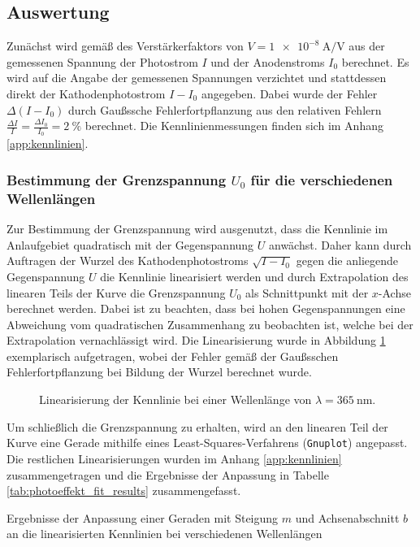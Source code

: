 \documentclass[11pt, a4paper]{article}
\numberwithin{equation}{section}
\begin{document}
\subsection{Auswertung}
Zunächst wird gemäß des Verstärkerfaktors von $V = \SI{1e-8}{\ampere\per\volt}$ aus der gemessenen Spannung der Photostrom $I$ und der Anodenstroms $I_0$ berechnet.
Es wird auf die Angabe der gemessenen Spannungen verzichtet und stattdessen direkt der Kathodenphotostrom $I-I_0$ angegeben.
Dabei wurde der Fehler $\Delta (I - I_0)$ durch Gaußssche Fehlerfortpflanzung aus den relativen Fehlern $\frac{\Delta I}{I} = \frac{\Delta I_0}{I_0} = \SI{2}{\percent}$ berechnet.
Die Kennlinienmessungen finden sich im Anhang \ref{app:kennlinien}.



\subsubsection{Bestimmung der Grenzspannung $U_0$ für die verschiedenen Wellenlängen}
\label{sssec:photoeffekt_grenzspannung}
Zur Bestimmung der Grenzspannung wird ausgenutzt, dass die Kennlinie im Anlaufgebiet quadratisch mit der Gegenspannung $U$ anwächst.
Daher kann durch Auftragen der Wurzel des Kathodenphotostroms $\sqrt{I-I_0}$ gegen die anliegende Gegenspannung $U$ die Kennlinie linearisiert werden und durch Extrapolation des linearen Teils der Kurve die Grenzspannung $U_0$ als Schnittpunkt mit der $x$-Achse berechnet werden.
Dabei ist zu beachten, dass bei hohen Gegenspannungen eine Abweichung vom quadratischen Zusammenhang zu beobachten ist, welche bei der Extrapolation vernachlässigt wird.
Die Linearisierung wurde in Abbildung \ref{fig:kennlinien_exemp_365nm} exemplarisch aufgetragen, wobei der Fehler gemäß der Gaußsschen Fehlerfortpflanzung bei Bildung der Wurzel berechnet wurde.
\begin{figure}[h]
	\centering
	
	\caption{Linearisierung der Kennlinie bei einer Wellenlänge von $\lambda = \SI{365}{\nano\metre}$. }
	\label{fig:kennlinien_exemp_365nm}
\end{figure}
Um schließlich die Grenzspannung zu erhalten, wird an den linearen Teil der Kurve eine Gerade mithilfe eines Least-Squares-Verfahrens (\texttt{Gnuplot}) angepasst.
Die restlichen Linearisierungen wurden im Anhang \ref{app:kennlinien} zusammengetragen und die Ergebnisse der Anpassung in Tabelle \ref{tab:photoeffekt_fit_results} zusammengefasst.
\begin{table}[h]
	\centering
	
	\caption{Ergebnisse der Anpassung einer Geraden mit Steigung $m$ und Achsenabschnitt $b$ an die linearisierten Kennlinien bei verschiedenen Wellenlängen}
	\label{tab:photoeffekt_fit_results}
\end{table}
\end{document}

